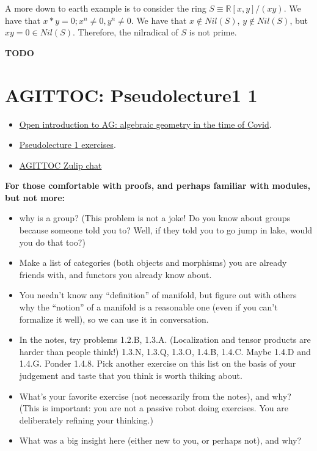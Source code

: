 \documentclass{book}
\theoremstyle{definition}
\begin{document}
A more down to earth example is to consider the ring $S \equiv \mathbb R[x, y] / (xy)$.
We have that $x * y = 0; x^n \neq 0, y^n \neq 0$. We have that $x \not \in Nil(S)$,
$y \not \in Nil(S)$, but $xy = 0 \in Nil(S)$. Therefore, the nilradical of $S$
is not prime.

\textbf{TODO}

\chapter{AGITTOC: Pseudolecture1 1}
\begin{itemize}
\item \href{https://math216.wordpress.com/agittoc-2020/}{Open introduction to AG: algebraic geometry in the time of Covid}.
\item \href{https://math216.wordpress.com/2020/06/27/discussion-for-this-week-starting-june-27-2020/}{Pseudolecture 1 exercises}.
\item \href{https://agittoc.zulipchat.com/}{AGITTOC Zulip chat}
\end{itemize}

\textbf{For those comfortable with proofs, and perhaps familiar with modules, but not more:}
\begin{itemize}
\item why is a group? (This problem is not a joke! Do you know about groups because someone told you to? Well, if they told you to go jump in lake, would you do that too?)
\item Make a list of categories (both objects and morphisms) you are already friends with, and functors you already know about.
\item You needn’t know any “definition” of manifold, but figure out with others why the “notion” of a manifold is a reasonable one (even if you can’t formalize it well), so we can use it in conversation.
\item In the notes, try problems 1.2.B, 1.3.A. (Localization and tensor products are harder than people think!) 1.3.N, 1.3.Q, 1.3.O, 1.4.B, 1.4.C. Maybe 1.4.D and 1.4.G. Ponder 1.4.8. Pick another exercise on this list on the basis of your judgement and taste that you think is worth thiking about.
\item What’s your favorite exercise (not necessarily from the notes), and why? (This is important: you are not a passive robot doing exercises. You are deliberately refining your thinking.)
\item What was a big insight here (either new to you, or perhaps not), and why?
\end{itemize}
\end{document}
